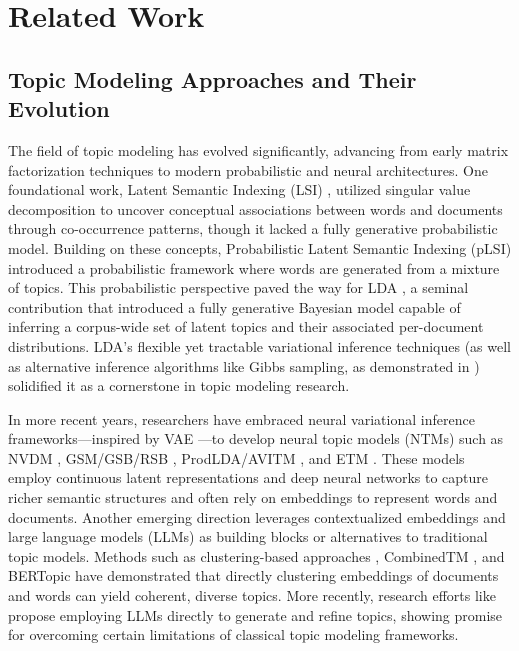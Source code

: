 \section{Related Work}
\subsection{Topic Modeling Approaches and Their Evolution} %
The field of topic modeling has evolved significantly, advancing from early matrix factorization techniques to modern probabilistic and neural architectures. One foundational work, Latent Semantic Indexing (LSI) \cite{papadimitriou1998LSI},
utilized singular value decomposition to uncover conceptual associations between words and documents through co-occurrence patterns, though it lacked a fully generative probabilistic model.
Building on these concepts, Probabilistic Latent Semantic Indexing (pLSI) \cite{hofmann1999pLSI}
introduced a probabilistic framework where words are generated from a mixture of topics. This probabilistic perspective paved the way for LDA \cite{blei2003LDA}, 
a seminal contribution that introduced a fully generative Bayesian model capable of inferring a corpus-wide set of latent topics and their associated per-document distributions. LDA’s flexible yet tractable variational inference techniques (as well as alternative inference algorithms like Gibbs sampling, as demonstrated in \cite{Griffiths2004Gibbs})
solidified it as a cornerstone in topic modeling research.


In more recent years, researchers have embraced neural variational inference frameworks—inspired by VAE \cite{Kingma2014VAE}
—to develop neural topic models (NTMs) such as 
NVDM \cite{miao2016NVDM}, 
GSM/GSB/RSB
\cite{miao2017GSM-GSB-RSB}, 
ProdLDA/AVITM \cite{srivastava2017ProdLDA-AVITM}, 
and ETM \cite{dieng2020ETM}. 
These models employ continuous latent representations and deep neural networks to capture richer semantic structures and often rely on embeddings to represent words and documents. 
Another emerging direction leverages contextualized embeddings and large language models (LLMs) as building blocks or alternatives to traditional topic models. Methods such as clustering-based approaches \cite{sia2020tired-cluster},
CombinedTM \cite{bianchi2021CombinedTM}, and 
BERTopic \cite{grootendorst2022bertopic}
have demonstrated that directly clustering embeddings of documents and words can yield coherent, diverse topics. More recently, research efforts like
\cite{pham2024topicgpt, mu2024llmtm, mu2024llmtm-granularity-hallucination} propose employing LLMs directly to generate and refine topics, showing promise for overcoming certain limitations of classical topic modeling frameworks.
